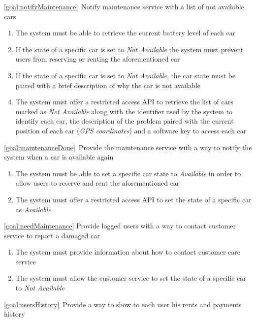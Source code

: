 \begin{description}
		\item \ref{goal:notifyMaintenance}\ Notify maintenance service with a list of not available
		cars
			\begin{enumerate}[resume*]
   				\item The system must be able to retrieve the current battery level of
   				each car
   				\item If the state of a specific car is set to \emph{Not Available} the
   				system must prevent users from reserving or renting the aforementioned car
   				\item If the state of a specific car is set to \emph{Not Available}, the
   				car state must be paired with a brief description of why the car is not
   				available
   				\item The system must offer a restricted access API to retrieve the list of cars marked
   				as \emph{Not Available} along with the identifier used by the system to identify each
   				car, the description of the problem paired with the current position of each car
   				(\emph{GPS coordinates}) and a software key to access each car
  			\end{enumerate}
		\item \ref{goal:maintenanceDone}\ Provide the maintenance service with a way to notify the system when a car is available again
			\begin{enumerate}[resume*]
   				\item The system must be able to set a specific car state to \emph{Available} in order 
   				to allow users to reserve and rent the aforementioned car
   				\item The system must offer a restricted access API to set the state of a
   				specific car as \emph{Available}
  			\end{enumerate}
  		\item \ref{goal:needMaintenance} Provide logged users with a way to contact customer service to report a damaged car
  		\begin{enumerate}[resume*]
  			\item The system must provide information about how to contact customer care
  			service
   			\item The system must allow the customer service to set the state of a
   			specific car to \emph{Not Available}	
  		\end{enumerate}
  		\item \ref{goal:usersHistory}\ Provide a way to show to each user his rents and payments history

\end{description}
